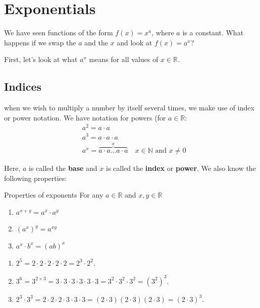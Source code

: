 %

\section{Exponentials}
We have seen functions of the form $f(x)=x^a$, where $a$ is a constant. What happens if we swap the $a$ and the $x$ and look at $f(x)=a^x$?

First, let's look at what $a^x$ means for all values of $x\in\mathbb{R}$.

\subsection{Indices}
when we wish to multiply a number by itself several times, we make use of index or power notation. We have notation for powers (for \(a\in\mathbb{R}\):
\begin{align*}
&a^2=a\cdot a\quad\\
&a^3=a\cdot a\cdot a\\
&a^x=\overbrace{a\cdot a \dots a\cdot a}^x \quad x\in\mathbb{N}\text{ and }x\not=0
\end{align*}

Here, $a$ is called the \textbf{base} and $x$ is called the \textbf{index} or \textbf{power}. We also know the following properties:
\begin{thing}{Properties of exponents}
For any $a\in\mathbb{R}$ and $x,y\in\mathbb{R}$
\begin{enumerate}
\item $a^{x+y}=a^x\cdot a^y$

\item $\left( a^x \right)^y=a^{xy}$

\item $a^x \cdot b^x = \left( ab \right)^x$
\end{enumerate}
\end{thing}

\begin{examples}
\begin{enumerate}
\item $2^5=2 \cdot 2 \cdot 2 \cdot 2 \cdot 2 =2^3 \cdot 2^2$.

\item $3^6=3^{2\times 3}=3 \cdot 3 \cdot 3 \cdot 3 \cdot 3 \cdot 3 = 3^2 \cdot 3^2 \cdot 3^2 = (3^2)^3$.

\item $2^3\cdot 3^3 = 2 \cdot 2 \cdot 2 \cdot 3 \cdot 3 \cdot 3=(2 \cdot 3)(2 \cdot 3)(2 \cdot 3)=(2 \cdot 3)^3$.
\end{enumerate}

\end{examples}

